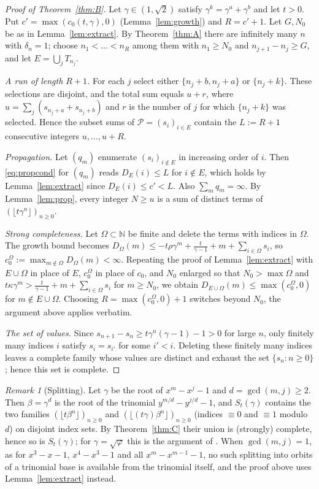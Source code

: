 \documentclass[11pt]{amsart}
\theoremstyle{definition}
\theoremstyle{remark}
\newtheorem{remark}[lemma]{Remark}
\newcommand{\N}{\mathbb{N}}
\newcommand{\fl}[1]{\lfloor #1\rfloor}
\begin{document}
\begin{proof}[Proof of Theorem~\ref{thm:B}]
Let $\gamma\in(1,\sqrt2)$ satisfy $\gamma^k=\gamma^a+\gamma^b$ and let $t>0$. Put
$c'=\max(c_0(t,\gamma),0)$ (Lemma~\ref{lem:growth}) and $R=c'+1$. Let $G,N_0$ be as in
Lemma~\ref{lem:extract}. By Theorem~\ref{thm:A} there are infinitely many $n$ with
$\delta_n=1$; choose $n_1<\dots<n_R$ among them with $n_1\ge N_0$ and $n_{j+1}-n_j\ge G$, and
let $E=\bigcup_jT_{n_j}$.

\emph{A run of length $R+1$.} For each $j$ select either $\{n_j+b,n_j+a\}$ or $\{n_j+k\}$.
These selections are disjoint, and the total sum equals $u+r$, where
$u=\sum_j(s_{n_j+a}+s_{n_j+b})$ and $r$ is the number of $j$ for which $\{n_j+k\}$ was
selected. Hence the subset sums of $\mathcal P=(s_i)_{i\in E}$ contain the $L:=R+1$
consecutive integers $u,\dots,u+R$.

\emph{Propagation.} Let $(q_m)$ enumerate $(s_i)_{i\notin E}$ in increasing order of $i$.
Then \eqref{eq:propcond} for $(q_m)$ reads $D_E(i)\le L$ for $i\notin E$, which holds by
Lemma~\ref{lem:extract} since $D_E(i)\le c'<L$. Also $\sum_mq_m=\infty$. By
Lemma~\ref{lem:prop}, every integer $N\ge u$ is a sum of distinct terms of
$(\fl{t\gamma^n})_{n\ge0}$.

\emph{Strong completeness.} Let $\Omega\subset\N$ be finite and delete the terms with indices in
$\Omega$. The growth bound becomes
$D_\Omega(m)\le-t\rho\gamma^m+\frac t{\gamma-1}+m+\sum_{i\in\Omega}s_i$, so
$c_0^\Omega:=\max_{m\notin\Omega}D_\Omega(m)<\infty$. Repeating the proof of
Lemma~\ref{lem:extract} with $E\cup\Omega$ in place of $E$, $c_0^\Omega$ in place of $c_0$, and
$N_0$ enlarged so that $N_0>\max\Omega$ and
$t\kappa\gamma^m>\frac t{\gamma-1}+m+\sum_{i\in\Omega}s_i$ for $m\ge N_0$, we obtain
$D_{E\cup\Omega}(m)\le\max(c_0^\Omega,0)$ for $m\notin E\cup\Omega$. Choosing
$R=\max(c_0^\Omega,0)+1$ switches
beyond $N_0$, the argument above applies verbatim.

\emph{The set of values.} Since $s_{n+1}-s_n\ge t\gamma^n(\gamma-1)-1>0$ for large $n$, only
finitely many indices $i$ satisfy $s_i=s_{i'}$ for some $i'<i$. Deleting these finitely many
indices leaves a complete family whose values are distinct and exhaust the set
$\{s_n:n\ge0\}$; hence this set is complete.
\end{proof}

\begin{remark}[Splitting]\label{rem:split}
Let $\gamma$ be the root of $x^m-x^j-1$ and $d=\gcd(m,j)\ge2$. Then $\beta=\gamma^d$ is the root of
the trinomial $y^{m/d}-y^{j/d}-1$, and $S_t(\gamma)$ contains the two families
$(\fl{t\beta^n})_{n\ge0}$ and $(\fl{(t\gamma)\beta^n})_{n\ge0}$ (indices $\equiv0$ and $\equiv1$
modulo $d$) on disjoint index sets. By Theorem~\ref{thm:C} their union is (strongly) complete,
hence so is $S_t(\gamma)$; for $\gamma=\sqrt\varphi$ this is the argument of \cite{Kit26}. When
$\gcd(m,j)=1$, as for $x^3-x-1$, $x^4-x^3-1$ and all $x^m-x^{m-1}-1$, no such splitting into
orbits of a trinomial base is available from the trinomial itself, and the proof above uses
Lemma~\ref{lem:extract} instead.
\end{remark}
\end{document}
